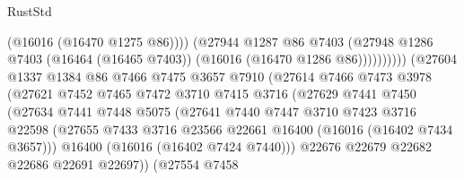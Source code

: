 \begin{lexlean}{RustStd}
\begin{coremodule}
                                          (@16016 (@16470 @1275 @86))))
                                      (@27944
                                        @1287
                                        @86
                                        @7403
                                        (@27948
                                          @1286
                                          @7403
                                          (@16464 (@16465 @7403))
                                          (@16016 (@16470 @1286 @86))))))))))
                          (@27604
                            @1337
                            @1384
                            @86
                            @7466
                            @7475
                            @3657
                            @7910
                            (@27614
                              @7466
                              @7473
                              @3978
                              (@27621
                                @7452
                                @7465
                                @7472
                                @3710
                                @7415
                                @3716
                                (@27629
                                  @7441
                                  @7450
                                  (@27634
                                    @7441
                                    @7448
                                    @5075
                                    (@27641
                                      @7440
                                      @7447
                                      @3710
                                      @7423
                                      @3716
                                      @22598
                                      (@27655
                                        @7433
                                        @3716
                                        @23566
                                        @22661
                                        @16400
                                        (@16016 (@16402 @7434 @3657)))
                                      @16400
                                      (@16016 (@16402 @7424 @7440)))
                                    @22676
                                    @22679
                                    @22682
                                    @22686
                                    @22691
                                    @22697))
                                (@27554
                                  @7458

\end{coremodule}
\end{lexlean}
